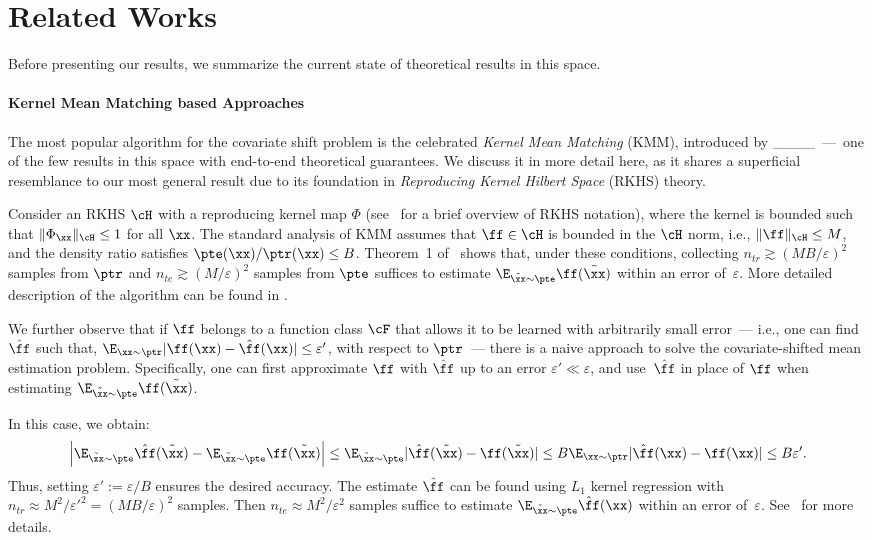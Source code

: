 \section{Related Works}
Before presenting our results, we summarize the current state of theoretical results in this space.

\paragraph{Kernel Mean Matching based Approaches}
The most popular algorithm for the covariate shift problem is the celebrated \emph{Kernel Mean Matching} (KMM), introduced by ____~---~one of the few results in this space with end-to-end theoretical guarantees. We discuss it in more detail here, as it shares a superficial resemblance to our most general result due to its foundation in \emph{Reproducing Kernel Hilbert Space} (RKHS) theory. 
 

Consider an RKHS $\cH$ with a reproducing kernel map $\Phi$ (see~ for a brief overview of RKHS notation),  where the kernel is bounded such that $\|\Phi_{\xx}\|_{\cH} \leq 1$ for all $\xx$. The standard analysis of KMM assumes that $\ff \in \cH$ is bounded in the $\cH$ norm, i.e., $\|\ff\|_{\cH} \leq M$, and the density ratio satisfies $\pte(\xx)/\ptr(\xx) \leq B$. Theorem~1 of~\textcite{yu2012analysis} shows that, under these conditions, collecting $n_{tr} \gtrsim (MB/\varepsilon)^2$ samples from $\ptr$ and $n_{te} \gtrsim (M/\varepsilon)^2$ samples from $\pte$ suffices to estimate $\E_{\tilde{\xx} \sim \pte} \ff(\tilde{\xx})$ within an error of~$\varepsilon$. More detailed description of the algorithm can be found in .

We further observe that if $\ff$ belongs to a function class $\cF$ that allows it to be learned with arbitrarily small error~--- i.e., one can find $\hat{\ff}$ such that, $\E_{\xx \sim \ptr} |\ff(\xx) - \hat{\ff}(\xx)| \leq \varepsilon'$, with respect to $\ptr$~--- there is a naive approach to solve the covariate-shifted mean estimation problem. Specifically, one can first approximate $\ff$ with $\hat{\ff}$ up to an error $\varepsilon' \ll \varepsilon$, and use~$\hat{\ff}$ in place of $\ff$ when estimating $\E_{\tilde{\xx}\sim\pte} \ff(\tilde{\xx})$. 

In this case, we obtain:
\begin{equation*}
\left|\E_{\tilde{\xx} \sim \pte} \hat{\ff}(\tilde{\xx}) - \E_{\tilde{\xx}\sim\pte} \ff(\tilde{\xx})\right| \leq \E_{\tilde{\xx} \sim \pte} |\hat{\ff}(\tilde{\xx}) - \ff(\tilde{\xx})| \leq B \E_{\xx \sim \ptr} |\hat{\ff}(\xx) - \ff(\xx)| \leq B \varepsilon'.
\end{equation*}
Thus, setting $\varepsilon':= \varepsilon/B$ ensures the desired accuracy. The estimate $\hat{\ff}$ can be found using $L_1$ kernel regression with $n_{tr} \approx M^2/{\varepsilon'}^2 = (MB/\varepsilon)^2$ samples. Then $n_{te} \approx M^2/\varepsilon^2$ samples suffice to estimate $\E_{\tilde{\xx} \sim 
\pte} \hat{\ff}(\xx)$ within an error of~$\varepsilon$. See~ for more details.

